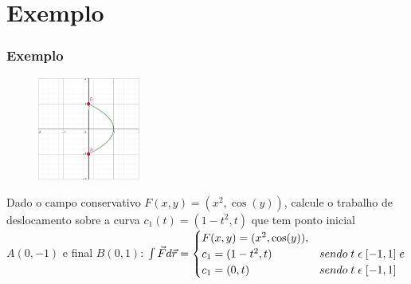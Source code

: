 \documentclass{beamer}
\def\vec{\mathaccent "017E\relax }
\begin{document}
\section{Exemplo}

\begin{frame}
    \frametitle{Exemplo} 

    \begin{figure} %
        \vspace{-35pt}
        \centering
        \caption{}
        \includegraphics[width=0.30\textwidth]{grafico-exemplo-1.png}
        \label{fig:grafico-exemplo1}
    \end{figure}

    Dado o campo conservativo $ F(x, y) = ( x^2, \cos(y) ) $, calcule o trabalho de deslocamento sobre a 
    curva $ c_1(t) = ( 1 - t^2, t ) $ que tem ponto inicial $ A(0, -1) $ e final $ B(0, 1) $:
    \hfill \break
    \hfill \break
    $
        \int{} \vec{F} d\vec{r} =  
        \begin{cases}
            F(x, y) = ( x^2, \cos(y) ),\\
            c_1 = ( 1 - t^2, t) &sendo \; t \; \epsilon \; [ -1, 1 ] \; e\\
            c_1 = ( 0, t)       &sendo \; t \; \epsilon \; [ -1, 1 ] \\
        \end{cases}
    $
%     
%     
%     

\end{frame}
\end{document}
